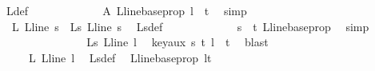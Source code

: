 \begin{isabellebody}
\ {\isasymchi}L{\isacharunderscore}{\kern0pt}def\ \isanewline
\ \ \ \ \ \ \ \ \ \ \isamarkupfalse%
\ A\ L{\isacharunderscore}{\kern0pt}line{\isacharunderscore}{\kern0pt}base{\isacharunderscore}{\kern0pt}prop\ {\isacartoucheopen}l\ {\isacharless}{\kern0pt}\ t{\isacartoucheclose}\ \isamarkupfalse%
\ simp\isanewline
\ \ \ \ \ \ \ \ \isamarkupfalse%
\ {\isachardoublequoteopen}{\isasymphi}\ {\isacharparenleft}{\kern0pt}{\isasymchi}L\ {\isacharparenleft}{\kern0pt}L{\isacharunderscore}{\kern0pt}line\ s{\isacharparenright}{\kern0pt}{\isacharparenright}{\kern0pt}\ {\isacharequal}{\kern0pt}\ {\isasymchi}L{\isacharunderscore}{\kern0pt}s\ {\isacharparenleft}{\kern0pt}L{\isacharunderscore}{\kern0pt}line\ s{\isacharparenright}{\kern0pt}{\isachardoublequoteclose}\ \isamarkupfalse%
\ {\isasymchi}L{\isacharunderscore}{\kern0pt}s{\isacharunderscore}{\kern0pt}def\ \isanewline
\ \ \ \ \ \ \ \ \ \ \isamarkupfalse%
\ {\isacartoucheopen}s\ {\isacharless}{\kern0pt}\ t{\isacartoucheclose}\ L{\isacharunderscore}{\kern0pt}line{\isacharunderscore}{\kern0pt}base{\isacharunderscore}{\kern0pt}prop\ \isamarkupfalse%
\ simp\isanewline
\ \ \ \ \ \ \ \ \isamarkupfalse%
\ \isamarkupfalse%
\ {\isachardoublequoteopen}\ {\isachardot}{\kern0pt}{\isachardot}{\kern0pt}{\isachardot}{\kern0pt}\ {\isacharequal}{\kern0pt}\ \ {\isasymchi}L{\isacharunderscore}{\kern0pt}s\ {\isacharparenleft}{\kern0pt}L{\isacharunderscore}{\kern0pt}line\ l{\isacharparenright}{\kern0pt}{\isachardoublequoteclose}\ \isamarkupfalse%
\ key{\isacharunderscore}{\kern0pt}aux\ {\isacartoucheopen}s\ {\isacharless}{\kern0pt}t{\isacartoucheclose}\ {\isacartoucheopen}l\ {\isacharless}{\kern0pt}\ t{\isacartoucheclose}\ \isamarkupfalse%
\ blast\isanewline
\ \ \ \ \ \ \ \ \isamarkupfalse%
\ \isamarkupfalse%
\ {\isachardoublequoteopen}\ {\isachardot}{\kern0pt}{\isachardot}{\kern0pt}{\isachardot}{\kern0pt}\ {\isacharequal}{\kern0pt}\ {\isasymphi}\ {\isacharparenleft}{\kern0pt}{\isasymchi}L\ {\isacharparenleft}{\kern0pt}L{\isacharunderscore}{\kern0pt}line\ l{\isacharparenright}{\kern0pt}{\isacharparenright}{\kern0pt}{\isachardoublequoteclose}\ \isamarkupfalse%
\ {\isasymchi}L{\isacharunderscore}{\kern0pt}s{\isacharunderscore}{\kern0pt}def\ \isamarkupfalse%
\ L{\isacharunderscore}{\kern0pt}line{\isacharunderscore}{\kern0pt}base{\isacharunderscore}{\kern0pt}prop\ {\isacartoucheopen}l{\isacharless}{\kern0pt}t{\isacartoucheclose}\isanewline

\end{isabellebody}
